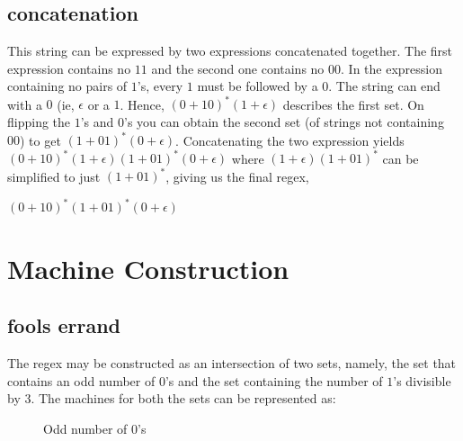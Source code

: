 \documentclass[11pt,letterpaper]{article}
\begin{document}
\subsection{concatenation}
This string can be expressed by two expressions concatenated together. The first expression contains no $11$ and the second one contains no $00$. In the expression containing no pairs of $1$'s, every $1$ must be followed by a $0$. The string can end with a $0$ (ie, $\epsilon$ or a $1$. Hence, $ (0+10)^*(1+\epsilon) $ describes the first set. On flipping the $1$'s and $0$'s you can obtain the second set (of strings not containing $00$) to get $ (1+01)^*(0+\epsilon) $. Concatenating the two expression yields $ (0+10)^*(1+\epsilon)(1+01)^*(0+\epsilon) $ where $ (1+\epsilon)(1+01)^* $ can be simplified to just $ (1+01)^* $, giving us the final regex,
\begin{center}
    $(0+10)^* (1+01)^*(0+\epsilon)$
\end{center}

\pagebreak


\section{Machine Construction}
\label{sec:2}

\subsection{fools errand}
The regex may be constructed as an intersection of two sets, namely, the set that contains an odd number of $0$'s and the set containing the number of $1$'s divisible by $3$. The machines for both the sets can be represented as:
\begin{figure}[!ht]
\label{fig:2a1}
\centering
{}
\caption{Odd number of $0$'s}
\end{figure}
\end{document}
